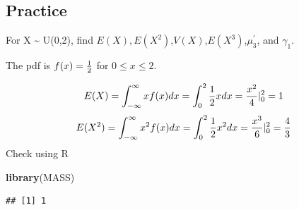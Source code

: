 \documentclass[]{book}
\newenvironment{Shaded}{\begin{snugshade}}{\end{snugshade}}
\newcommand{\KeywordTok}[1]{\textcolor[rgb]{0.13,0.29,0.53}{\textbf{#1}}}
\newcommand{\DecValTok}[1]{\textcolor[rgb]{0.00,0.00,0.81}{#1}}
\newcommand{\StringTok}[1]{\textcolor[rgb]{0.31,0.60,0.02}{#1}}
\newcommand{\ControlFlowTok}[1]{\textcolor[rgb]{0.13,0.29,0.53}{\textbf{#1}}}
\newcommand{\OperatorTok}[1]{\textcolor[rgb]{0.81,0.36,0.00}{\textbf{#1}}}
\newcommand{\NormalTok}[1]{#1}
\theoremstyle{definition}
\theoremstyle{definition}
\theoremstyle{definition}
\theoremstyle{remark}
\begin{document}
\subsection{Practice}\label{practice-1}

For X \textasciitilde{} U(0,2), find
\(E(X),E(X^2)\),\(V(X)\),\(E(X^3)\),\(\mu^{'}_3\), and \(\gamma_1\).

The pdf is \(f(x)={1 \over 2}\) for \(0\leq x \leq 2\).

\[E(X)=\int_{-\infty}^{\infty}xf(x)dx=\int_{0}^{2}{1 \over 2}xdx={x^2 \over 4}\vert_{0}^{2}=1\]
\[E(X^2)=\int_{-\infty}^{\infty}x^2f(x)dx=\int_{0}^{2}{1 \over 2}x^2dx={x^3 \over 6}\vert_{0}^{2}={4 \over 3}\]
Check using R

\begin{Shaded}
\begin{Highlighting}[]
\KeywordTok{library}\NormalTok{(MASS)}
\end{Highlighting}
\end{Shaded}

\begin{Shaded}
\end{Shaded}

\begin{verbatim}
## [1] 1
\end{verbatim}

\begin{Shaded}
\end{Shaded}
\end{document}
